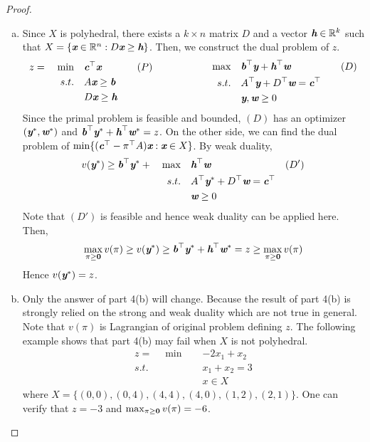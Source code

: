 \begin{enumerate}
\begin{proof}
\begin{enumerate}[(a)]
			\item
			Since $X$ is polyhedral, there exists a $k\times n$ matrix $D$ and a vector $\textit{\textbf{h}}\in \mathbb{R}^k$ such that $X = \{\textit{\textbf{x}}\in \mathbb{R}^n: D\textit{\textbf{x}}\ge \textit{\textbf{h}}\}$. Then, we construct the dual problem of $z$.
			\[
			\begin{aligned}
			z = \quad\min \quad &\textit{\textbf{c}}^\top\textit{\textbf{x}}&\quad (P)\\
			s.t. \quad & A\textit{\textbf{x}} \ge \textit{\textbf{b}}\\
			&D\textit{\textbf{x}} \ge \textit{\textbf{h}}
			\end{aligned}
			\quad \quad \quad \quad \quad 
			\begin{aligned}
			 \quad \max \quad &\textit{\textbf{b}}^\top\textit{\textbf{y}}+\textit{\textbf{h}}^\top\textit{\textbf{w}}&\quad (D)\\
			s.t. \quad & A^\top\textit{\textbf{y}}+D^\top\textit{\textbf{w}} = \textit{\textbf{c}}^\top\\
			&\textit{\textbf{y}}, \textit{\textbf{w}} \ge 0
			\end{aligned}
			\] 
			Since the primal problem is feasible and bounded, $(D)$ has an optimizer $(\textit{\textbf{y}}^*,\textit{\textbf{w}}^*)$ and $\textit{\textbf{b}}^\top\textit{\textbf{y}}^*+\textit{\textbf{h}}^\top\textit{\textbf{w}}^*=z$. On the other side, we can find the dual problem of $\min \{(\textit{\textbf{c}}^\top-\textit{\textbf{$\pi$}}^\top A)\textit{\textbf{x}}:  \textit{\textbf{x}} \in X\}$. By weak duality, 
			\begin{align*}
			v(\textit{\textbf{y}}^*) \ge \textit{\textbf{b}}^\top\textit{\textbf{y}}^*+\quad\max \quad &\textit{\textbf{h}}^\top\textit{\textbf{w}} &(D')\\
			s.t. \quad &A^\top\textit{\textbf{y}}^* + D^\top\textit{\textbf{w}} = \textit{\textbf{c}}^\top\\
			&\textit{\textbf{w}} \ge 0			 
			\end{align*}
			Note that $(D')$ is feasible and hence weak duality can be applied here. Then, 
			 \[
			 \max_{\textit{\textbf{$\pi$}} \ge \textbf{0}} v(\textit{\textbf{$\pi$}}) \ge v(\textit{\textbf{y}}^*) \ge \textit{\textbf{b}}^\top\textit{\textbf{y}}^*+\textit{\textbf{h}}^\top\textit{\textbf{w}}^* = z \ge \max_{\textit{\textbf{$\pi$}} \ge \textbf{0}} v(\textit{\textbf{$\pi$}})
			 \]  
			 Hence $v(\textit{\textbf{y}}^*)  = z$.
			
			\item 
			Only the answer of part 4(b) will change. Because the result of part 4(b) is strongly relied on the strong and weak duality which are not true in general. Note that $v(\pi)$ is Lagrangian of original problem defining $z$. 
			The following example shows that part 4(b) may fail when $X$ is not polyhedral. 
			 \[
			 \begin{aligned}
			 z=\quad \min \quad &-2x_1+x_2\\
			 s.t. \quad &x_1+x_2 = 3\\
			 &x\in X
			 \end{aligned}
			 \]
			 where $X=\{(0,0),(0,4),(4,4),(4,0),(1,2),(2,1)\}$. One can verify that $z=-3$ and $\max_{\textit{\textbf{$\pi$}} \ge \textbf{0}} v(\textit{\textbf{$\pi$}}) = -6$.
			
		\end{enumerate}
	\end{proof}


\end{enumerate}
